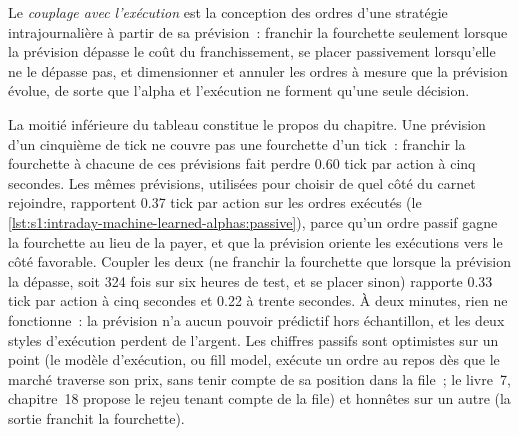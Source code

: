 \begin{definition}\label{def:s1:intraday-machine-learned-alphas:coupling}
Le \emph{couplage avec l'exécution} est la conception des ordres d'une stratégie intrajournalière à partir de sa prévision~: franchir la fourchette seulement lorsque la
prévision dépasse le coût du franchissement, se placer passivement lorsqu'elle ne le dépasse pas, et dimensionner et annuler les ordres à mesure que la prévision évolue, de sorte que l'alpha et
l'exécution ne forment qu'une seule décision.
\end{definition}

La moitié inférieure du tableau constitue le propos du chapitre. Une prévision d'un cinquième de tick ne couvre pas une fourchette d'un tick~: franchir la fourchette à chacune de ces prévisions fait perdre 0.60
tick par action à cinq secondes. Les mêmes prévisions, utilisées pour choisir de quel côté du carnet rejoindre, rapportent 0.37 tick par action sur les ordres exécutés
(le \cref{lst:s1:intraday-machine-learned-alphas:passive}), parce qu'un ordre passif gagne la fourchette au lieu de la payer, et que la prévision oriente les exécutions
vers le côté favorable. Coupler les deux (ne franchir la fourchette que lorsque la prévision la dépasse, soit 324 fois sur six heures de test, et se placer sinon)
rapporte 0.33 tick par action à cinq secondes et 0.22 à trente secondes. À deux minutes, rien ne fonctionne~: la prévision n'a aucun pouvoir prédictif hors échantillon, et les deux styles d'exécution
perdent de l'argent. Les chiffres passifs sont optimistes sur un point (le modèle d'exécution, ou fill model, exécute un ordre au repos dès que le marché traverse son prix, sans tenir compte de sa
position dans la file~; le livre~7, chapitre~18 propose le rejeu tenant compte de la file) et honnêtes sur un autre (la sortie franchit la fourchette).

